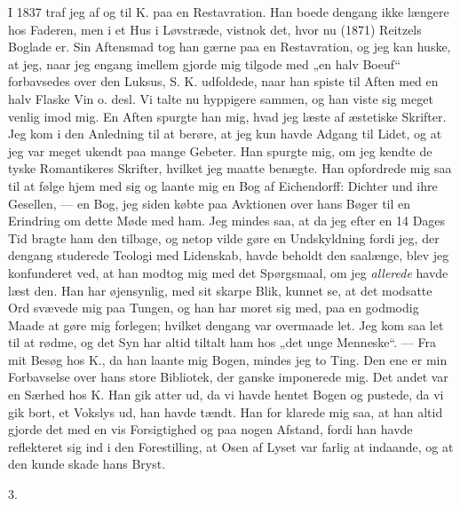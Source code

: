 \documentclass[12pt,a4paper,openany]{book}
\newcommand{\secnum}[1]{\par\begin{center}#1\end{center}\par\nobreak}
\newcommand{\opage}[1]{\marginnote{\footnotesize\textit{[#1]}}}
\begin{document}
\opage{339}I 1837 traf jeg af og til K. paa en Restavration.
Han boede dengang ikke længere hos Faderen, men i et
Hus i Løvstræde, vistnok det, hvor nu (1871) Reitzels
Boglade er. Sin Aftensmad tog han gærne paa en Restavration,
og jeg kan huske, at jeg, naar jeg engang
imellem gjorde mig tilgode med „en halv Boeuf“ forbavsedes
over den Luksus, S. K. udfoldede, naar han spiste
til Aften med en halv Flaske Vin o. desl. Vi talte nu
hyppigere sammen, og han viste sig meget venlig imod
mig. En Aften spurgte han mig, hvad jeg læste af
æstetiske Skrifter. Jeg kom i den Anledning til at
berøre, at jeg kun havde Adgang til Lidet, og at jeg
var meget ukendt paa mange Gebeter. Han spurgte
mig, om jeg kendte de tyske Romantikeres Skrifter,
hvilket jeg maatte benægte. Han opfordrede mig saa
til at følge hjem med sig og laante mig en Bog af
Eichendorff: Dichter und ihre Gesellen, --- en Bog, jeg
siden købte paa Avktionen over hans Bøger til en Erindring
om dette Møde med ham. Jeg mindes saa, at da
jeg efter en 14 Dages Tid bragte ham den tilbage, og
netop vilde gøre en Undskyldning fordi jeg, der dengang
studerede Teologi med Lidenskab, havde beholdt den
saalænge, blev jeg konfunderet ved, at han modtog mig
med det Spørgsmaal, om jeg \emph{allerede} havde læst den.
Han har øjensynlig, med sit skarpe Blik, kunnet se, at
det modsatte Ord svævede mig paa Tungen, og han har
moret sig med, paa en godmodig Maade at gøre mig
forlegen; hvilket dengang var overmaade let. Jeg kom
saa let til at rødme, og det Syn har altid tiltalt ham
hos „det unge Menneske“. --- Fra mit Besøg hos K., da
han laante mig Bogen, mindes jeg to Ting. Den ene er
min Forbavselse over hans store Bibliotek, der ganske
imponerede mig. Det andet var en Særhed hos K. Han
gik atter ud, da vi havde hentet Bogen og pustede, da
vi gik bort, et Vokslys ud, han havde tændt. Han for%
\opage{340}klarede mig saa, at han altid gjorde det med en vis
Forsigtighed og paa nogen Afstand, fordi han havde
reflekteret sig ind i den Forestilling, at Osen af Lyset
var farlig at indaande, og at den kunde skade hans
Bryst.

\secnum{3.}
\end{document}
